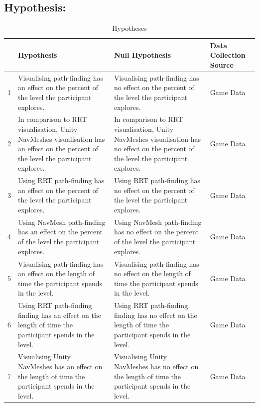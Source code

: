 \documentclass[journal]{IEEEtran}
\begin{document}
	\subsection{Hypothesis:} \label{hypothesis}
	\begin{table}[h]
		\centering
		\caption{Hypotheses}
		\label{table:Hypothesis}
		\def\arraystretch{1.5}
		\begin{tabular}{|c|p{7cm}|p{7cm}|p{1.75cm}|}
			\hline
			& \textbf{Hypothesis}& \textbf{Null Hypothesis} & \textbf{Data Collection Source}\\
			\hline
			1 & Visualising path-finding has an effect on the percent of the level the participant explores.
			& Visualising path-finding has no effect on the percent of the level the participant explores.
			& Game Data \\ \hline
			
			2 & In comparison to RRT visualisation, Unity NavMeshes visualisation has an effect on the percent of the level the participant explores.
			& In comparison to RRT visualisation, Unity NavMeshes visualisation has no effect on the percent of the level the participant explores.
			& Game Data \\ \hline
						
			3 & Using RRT path-finding has an effect on the percent of the level the participant explores.
			& Using RRT path-finding has no effect on the percent of the level the participant explores.
				& Game Data \\ \hline
			
			4 & Using NavMesh path-finding has an effect on the percent of the level the participant explores.
			& Using NavMesh path-finding has no effect on the percent of the level the participant explores.
				& Game Data \\ \hline
			
			5 & Visualising path-finding has an effect on the length of time the participant spends in the level. 
			& Visualising path-finding has no effect on the length of time the participant spends in the level. 
			& Game Data \\ \hline
				
			6 & Using RRT path-finding finding has an effect on the length of time the participant spends in the level. 
			& Using RRT path-finding finding has no effect on the length of time the participant spends in the level. 
			& Game Data \\ \hline
			
			7 & Visualising Unity NavMeshes has an effect on the length of time the participant spends in the level. 
			& Visualising Unity NavMeshes has no effect on the length of time the participant spends in the level.
			& Game Data \\ \hline
			

\end{tabular}
\end{table}
\end{document}
